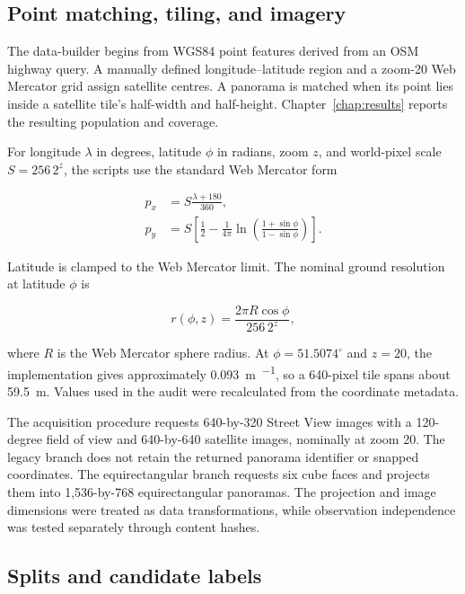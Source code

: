 \subsection{Point matching, tiling, and imagery}

The data-builder begins from WGS84 point features derived from an OSM highway
query.  A manually defined longitude--latitude region and a zoom-20 Web
Mercator grid assign satellite centres.  A panorama is matched when its point
lies inside a satellite tile's half-width and half-height.  Chapter~\ref{chap:results}
reports the resulting population and coverage.

For longitude $\lambda$ in degrees, latitude $\phi$ in radians, zoom $z$, and
world-pixel scale $S=256\,2^z$, the scripts use the standard Web Mercator form

\begin{align}
p_x &= S\frac{\lambda+180}{360},\\
p_y &= S\left[\frac{1}{2}-\frac{1}{4\pi}
  \ln\left(\frac{1+\sin\phi}{1-\sin\phi}\right)\right].
\end{align}

Latitude is clamped to the Web Mercator limit.  The nominal ground resolution
at latitude $\phi$ is

\begin{equation}
r(\phi,z)=\frac{2\pi R\cos\phi}{256\,2^z},
\end{equation}

where $R$ is the Web Mercator sphere radius.  At $\phi=51.5074^\circ$ and
$z=20$, the implementation gives approximately
\SI{0.093}{\metre\per\pixel}, so a 640-pixel tile spans about
\SI{59.5}{\metre}.  Values used in the audit were recalculated from the
coordinate metadata.

The acquisition procedure requests 640-by-320 Street View images with a
120-degree field of view and 640-by-640 satellite images, nominally at zoom 20.
The legacy branch does not retain the returned panorama identifier or snapped
coordinates.  The equirectangular branch requests six cube faces and projects them into 1,536-by-768
equirectangular panoramas.  The projection and image dimensions were treated
as data transformations, while observation independence was tested separately
through content hashes.

\subsection{Splits and candidate labels}

